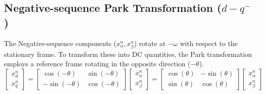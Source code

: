 \subsection{Negative-sequence Park Transformation (\texorpdfstring{$d-q^-$}{dq-})}
The Negative-sequence components ($x_{\alpha}^n, x_{\beta}^n$) rotate at $-\omega$ with respect to the stationary frame.
To transform these into DC quantities, the Park transformation employs a reference frame rotating in the opposite direction ($-\theta$).
\begin{equation}
    \begin{bmatrix}
        x_d^n \\
        x_q^n
    \end{bmatrix}
    =
    \begin{bmatrix}
        \cos(-\theta)  & \sin(-\theta) \\
        -\sin(-\theta) & \cos(-\theta)
    \end{bmatrix}
    \begin{bmatrix}
        x_{\alpha}^n \\
        x_{\beta}^n
    \end{bmatrix}
    =
    \begin{bmatrix}
        \cos(\theta) & -\sin(\theta) \\
        \sin(\theta) & \cos(\theta)
    \end{bmatrix}
    \begin{bmatrix}
        x_{\alpha}^n \\
        x_{\beta}^n
    \end{bmatrix}
\end{equation}
